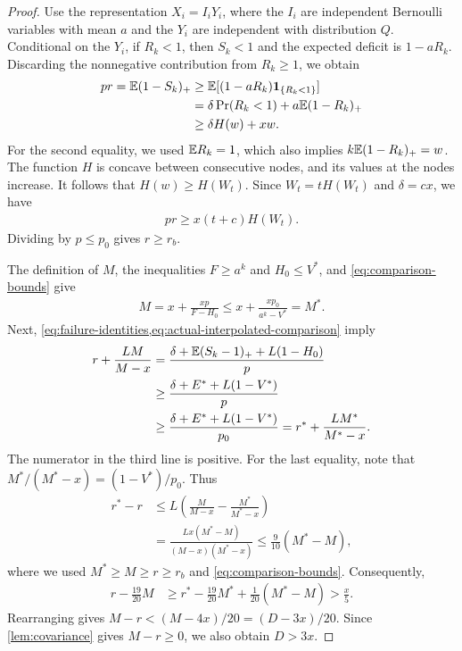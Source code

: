 \begin{proof}
Use the representation $X_i=I_iY_i$, where the $I_i$ are independent Bernoulli variables with mean $a$ and the $Y_i$ are independent with distribution $Q$.
Conditional on the $Y_i$, if $R_k<1$, then $S_k<1$ and the expected deficit is $1-aR_k$.
Discarding the nonnegative contribution from $R_k\ge1$, we obtain
\begin{align*}
 pr=\mathbb E(1-S_k)_+
 &\ge\mathbb E[(1-aR_k)\mathbf 1_{\{R_k<1\}}]\\
 &=\delta\Pr(R_k<1)+a\mathbb E(1-R_k)_+\\
 &\ge\delta H(w)+xw.
\end{align*}
For the second equality, we used $\mathbb E R_k=1$, which also implies $k\mathbb E(1-R_k)_+=w$.
The function $H$ is concave between consecutive nodes, and its values at the nodes increase.
It follows that $H(w)\ge H(W_t)$.
Since $W_t=tH(W_t)$ and $\delta=cx$, we have
\begin{align*}
 pr\ge x(t+c)H(W_t).
\end{align*}
Dividing by $p\le p_0$ gives $r\ge r_b$.

The definition of $M$, the inequalities $F\ge a^k$ and $H_0\le V^*$, and \cref{eq:comparison-bounds} give
\begin{align*}
 M=x+\frac{xp}{F-H_0}\le x+\frac{xp_0}{a^k-V^*}=M^*.
\end{align*}
Next, \cref{eq:failure-identities,eq:actual-interpolated-comparison} imply
\begin{align*}
 r+\frac{LM}{M-x}
 &=\frac{\delta+\mathbb E(S_k-1)_++L(1-H_0)}p\\
 &\ge\frac{\delta+E^*+L(1-V^*)}{p}\\
 &\ge\frac{\delta+E^*+L(1-V^*)}{p_0}
 =r^*+\frac{LM^*}{M^*-x}.
\end{align*}
The numerator in the third line is positive.
For the last equality, note that $M^*/(M^*-x)=(1-V^*)/p_0$.
Thus
\begin{align*}
 r^*-r
 &\le L\left(\frac{M}{M-x}-\frac{M^*}{M^*-x}\right)\\
 &=\frac{Lx(M^*-M)}{(M-x)(M^*-x)}
 \le\frac9{10}(M^*-M),
\end{align*}
where we used $M^*\ge M\ge r\ge r_b$ and \cref{eq:comparison-bounds}.
Consequently,
\begin{align*}
 r-\frac{19}{20}M
 &\ge r^*-\frac{19}{20}M^*+\frac1{20}(M^*-M)
 >\frac x5.
\end{align*}
Rearranging gives $M-r<(M-4x)/20=(D-3x)/20$.
Since \cref{lem:covariance} gives $M-r\ge0$, we also obtain $D>3x$.
\end{proof}

